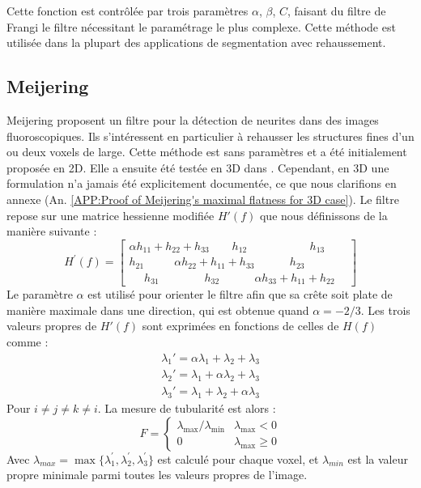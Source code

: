Cette fonction est contrôlée par trois paramètres $\alpha$, $\beta$, $C$, faisant du filtre de Frangi le filtre nécessitant le paramétrage le plus complexe. Cette méthode est utilisée dans la plupart des applications de segmentation avec rehaussement.

\subsection{Meijering}

Meijering \etal \cite{Meijering2004_neurite_vesselness} proposent un filtre pour la détection de neurites dans des images fluoroscopiques. Ils s'intéressent en particulier à rehausser les structures fines d'un ou deux voxels de large. Cette méthode est sans paramètres et a été initialement proposée en 2D. Elle a ensuite été testée en 3D dans \cite{Obara2012_phase}. Cependant, en 3D une formulation n'a jamais été explicitement documentée, ce que nous clarifions en annexe (An. \ref{APP:Proof of Meijering's maximal flatness for 3D case}). Le filtre repose sur une matrice hessienne modifiée $H'(f)$ que nous définissons de la manière suivante :
\begin{equation}
    H^{'}(f)=
    \begin{bmatrix}
    \alpha h_{11}+ h_{22} +   h_{33} ~~~~~~~~~ h_{12} ~~~~~~~~~~~~~~~~~~~~~~~~~ h_{13} ~~~~~~~~ \\
    h_{21} ~~~~~~~~~~~~ \alpha h_{22} + h_{11} +  h_{33} ~~~~~~~~~~~~~~ h_{23} \\
    ~~~~~~ h_{31} ~~~~~~~~~~~~~~~~~~ h_{32} ~~~~~~~~~~~~~~ \alpha h_{33} + h_{11} +  h_{22}
    \end{bmatrix}
\end{equation}
Le paramètre $\alpha$ est utilisé pour orienter le filtre afin que sa crête soit plate de manière maximale dans une direction, qui est obtenue quand $\alpha=-2/3$. Les trois valeurs propres de $H'(f)$ sont exprimées en fonctions de celles de $H(f)$ comme :
\begin{equation}
  \begin{aligned}
    \nonumber \lambda_1' = \alpha\lambda_1 + \lambda_2 + \lambda_3 \\
    \nonumber \lambda_2' = \lambda_1 + \alpha\lambda_2 + \lambda_3 \\
    \nonumber \lambda_3' = \lambda_1 + \lambda_2 + \alpha\lambda_3
  \end{aligned}
\end{equation}
Pour $i \neq j \neq k \neq i$.
La mesure de tubularité est alors :
\begin{equation}
\nonumber 
  F =
  \left\{
  \begin{array}{lr}
    \lambda_{\max} / \lambda_{\min}   &  \lambda_{\max} < 0\\
      0 &  \lambda_{\max} \geqslant 0
  \end{array}
  \right.
\end{equation}
Avec $\lambda_{max} = \max\{\lambda_{1}^{'},\lambda_{2}^{'},\lambda_{3}^{'}\}$ est calculé pour chaque voxel, et $\lambda_{min}$ est la valeur propre minimale parmi toutes les valeurs propres de l'image.

